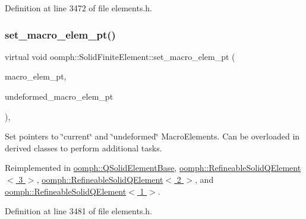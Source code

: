 Definition at line 3472 of file elements.\+h.

\mbox{\label{classoomph_1_1SolidFiniteElement_a05bdd718a54628b6cf81fc94ad4cb6ab}} 
\subsubsection{\texorpdfstring{set\+\_\+macro\+\_\+elem\+\_\+pt()}{set\_macro\_elem\_pt()}\hspace{0.1cm}{\footnotesize\ttfamily [2/2]}}
{\footnotesize\ttfamily virtual void oomph\+::\+Solid\+Finite\+Element\+::set\+\_\+macro\+\_\+elem\+\_\+pt (\begin{DoxyParamCaption}\item[{\hyperlink{classoomph_1_1MacroElement}{Macro\+Element} $\ast$}]{macro\+\_\+elem\+\_\+pt,  }\item[{\hyperlink{classoomph_1_1MacroElement}{Macro\+Element} $\ast$}]{undeformed\+\_\+macro\+\_\+elem\+\_\+pt }\end{DoxyParamCaption})\hspace{0.3cm}{\ttfamily [inline]}, {\ttfamily [virtual]}}



Set pointers to \char`\"{}current\char`\"{} and \char`\"{}undeformed\char`\"{} Macro\+Elements. Can be overloaded in derived classes to perform additional tasks. 



Reimplemented in \hyperlink{classoomph_1_1QSolidElementBase_aa7f14a039224fb4c513da587448d2c3b}{oomph\+::\+Q\+Solid\+Element\+Base}, \hyperlink{classoomph_1_1RefineableSolidQElement_3_013_01_4_ab2c2950454d7c4ea16a597192c7fae15}{oomph\+::\+Refineable\+Solid\+Q\+Element$<$ 3 $>$}, \hyperlink{classoomph_1_1RefineableSolidQElement_3_012_01_4_a8c0cb9d011cc070322945b1fecd03331}{oomph\+::\+Refineable\+Solid\+Q\+Element$<$ 2 $>$}, and \hyperlink{classoomph_1_1RefineableSolidQElement_3_011_01_4_a9dd7e2622260d14c2bf92125707a3401}{oomph\+::\+Refineable\+Solid\+Q\+Element$<$ 1 $>$}.



Definition at line 3481 of file elements.\+h.

\mbox{\label{classoomph_1_1SolidFiniteElement_a74b681075150c90417939b0b0c836dda}} 
